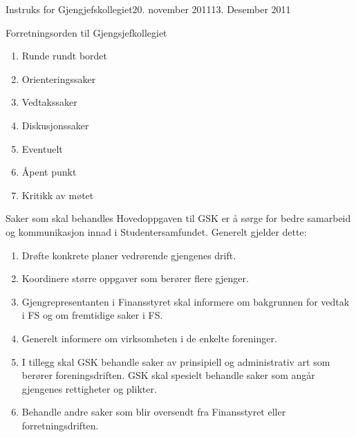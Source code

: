 \begin{instruks}{Instruks for Gjengjefskollegiet}{20. november 2011}{13. Desember 2011}
\begin{instruksledd}{Forretningsorden til Gjengsjefkollegiet}
\begin{enumerate}
\begin{enumerate}
\begin{enumerate}
                            \item Runde rundt bordet
                            \item Orienteringssaker
                            \item Vedtakssaker
                            \item Diskusjonssaker
                            \item Eventuelt
                            \item Åpent punkt
                            \item Kritikk av møtet
                        \end{enumerate}
                \end{enumerate}
        \end{enumerate}
    \end{instruksledd}

    \begin{instruksledd}{Saker som skal behandles}
        Hovedoppgaven til GSK er å sørge for bedre samarbeid og kommunikasjon innad i
        Studentersamfundet. Generelt
        gjelder dette:
        \begin{enumerate}
            \item Drøfte konkrete planer vedrørende gjengenes drift.
            \item Koordinere større oppgaver som berører flere gjenger.
            \item Gjengrepresentanten i Finansstyret skal informere om bakgrunnen for
                vedtak i FS og om fremtidige saker i FS.
            \item Generelt informere om virksomheten i de enkelte foreninger.
            \item I tillegg skal GSK behandle saker av prinsipiell og administrativ art
                som berører foreningsdriften. GSK skal
                spesielt behandle saker som angår gjengenes rettigheter og plikter.
            \item Behandle andre saker som blir oversendt fra Finansstyret eller
                forretningsdriften.
        \end{enumerate}

    \end{instruksledd}
\end{instruks}







